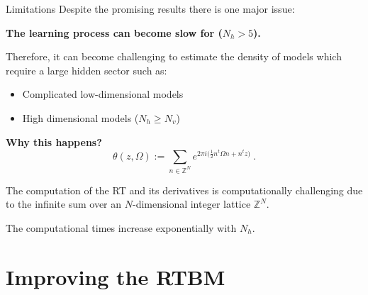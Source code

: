 \documentclass[10pt]{beamer}
\begin{document}
\begin{frame}{Limitations}
    Despite the promising results there is one major issue: 
    \begin{center}
        \textbf{The learning process can become slow for ($N_h > 5$).} 
    \end{center}
    Therefore, it can become challenging to estimate the density of models which require a large hidden sector such as:
    \begin{itemize}
        \item Complicated low-dimensional models
        \item High dimensional models ($N_h \geq N_v$)
    \end{itemize}
    
    \begin{center}
        \textbf{Why this happens?}
        \begin{equation*}
            \theta ( z, \Omega) :=
            \sum_{n \in \mathbb{Z}^N} e^{2 \pi i \big( \frac{1}{2}n^t \Omega n + n^t z \big)} \ .
        \end{equation*}
    \end{center}

    The computation of the RT and its derivatives is computationally challenging due to the infinite sum over 
    an $N$-dimensional integer lattice $\mathbb{Z}^N$.

    The computational times increase exponentially with $N_h$.
    


\end{frame}

\section{Improving the RTBM}




\end{document}
